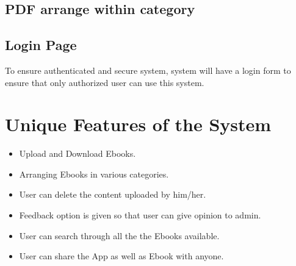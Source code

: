 \subsection{PDF arrange within category}
\subsection{Login Page}
To ensure authenticated and secure system, system will have a login form to ensure that only authorized user can use this system. 

\section{Unique Features of the System}
\begin{itemize}

\item Upload and Download Ebooks.
\item Arranging Ebooks in various categories.
\item User can delete the content uploaded by him/her.
\item Feedback option is given so that user can give opinion to admin.
\item User can search through all the the Ebooks available.
\item User can share the App as well as Ebook with anyone. 
\end{itemize}


